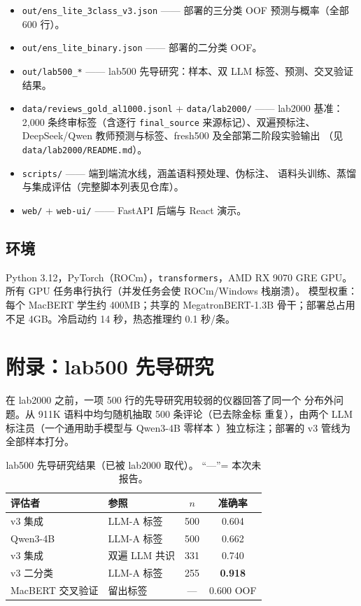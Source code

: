 \documentclass[11pt,a4paper]{article}
\newcommand{\code}[1]{\texttt{#1}}
\begin{document}
\begin{itemize}
  \item \code{out/ens\_lite\_3class\_v3.json} —— 部署的三分类
        OOF 预测与概率（全部 600 行）。
  \item \code{out/ens\_lite\_binary.json} —— 部署的二分类 OOF。
  \item \code{out/lab500\_*} —— lab500 先导研究：样本、双 LLM
        标签、预测、交叉验证结果。
  \item \code{data/reviews\_gold\_al1000.jsonl} + \code{data/lab2000/}
        —— lab2000 基准：2{,}000 条终审标签（含逐行
        \code{final\_source} 来源标记）、双遍预标注、DeepSeek/Qwen
        教师预测与标签、fresh500 及全部第二阶段实验输出
        （见 \code{data/lab2000/README.md}）。
  \item \code{scripts/} —— 端到端流水线，涵盖语料预处理、伪标注、
        语料头训练、蒸馏与集成评估（完整脚本列表见仓库）。
  \item \code{web/} + \code{web-ui/} —— FastAPI 后端与 React 演示。
\end{itemize}

\subsection{环境}

Python 3.12，PyTorch（ROCm），\code{transformers}，AMD RX 9070 GRE
GPU。所有 GPU 任务串行执行（并发任务会使 ROCm/Windows 栈崩溃）。
模型权重：每个 MacBERT 学生约 400MB；共享的 MegatronBERT-1.3B
骨干；部署总占用不足 4GB。冷启动约 14 秒，热态推理约 0.1 秒/条。

\section{附录：lab500 先导研究}
\label{app:lab500}

在 lab2000 之前，一项 500 行的先导研究用较弱的仪器回答了同一个
分布外问题。从 911K 语料中均匀随机抽取 500 条评论（已去除金标
重复），由两个 LLM 标注员（一个通用助手模型与 Qwen3-4B 零样本
\citep{qwen2025}）独立标注；部署的 v3 管线为全部样本打分。

\begin{table}[H]
\centering\small
\caption{lab500 先导研究结果（已被 lab2000 取代）。
“---”= 本次未报告。}
\label{tab:lab500-app}
\begin{tabular}{llcc}
\toprule
评估者 & 参照 & $n$ & 准确率 \\
\midrule
v3 集成          & LLM-A 标签      & 500 & 0.604 \\
Qwen3-4B         & LLM-A 标签      & 500 & 0.662 \\
v3 集成          & 双遍 LLM 共识     & 331 & 0.740 \\
v3 二分类        & LLM-A 标签      & 255 & \textbf{0.918} \\
MacBERT 交叉验证 & 留出标签         & --- & 0.600 OOF \\
\bottomrule
\end{tabular}
\end{table}
\end{document}
